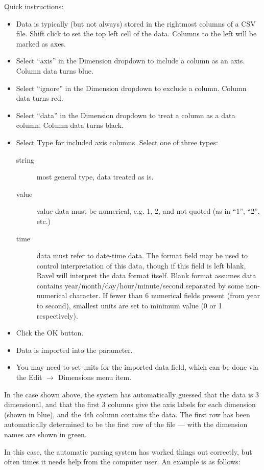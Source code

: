 Quick instructions: 
\begin{itemize}
\item Data is typically (but not always) stored in the rightmost columns
of a CSV file. Shift click to set the top left cell of the data. Columns
to the left will be marked as axes. 
\item Select ``axis'' in the Dimension dropdown to include a column as
an axis. Column data turns blue. 
\item Select ``ignore'' in the Dimension dropdown to exclude a column.
Column data turns red. 
\item Select ``data'' in the Dimension dropdown to treat a column as a
data column. Column data turns black. 
\item Select Type for included axis columns. Select one of three types: 
\begin{description}
\item [{string}] most general type, data treated as is. 
\item [{value}] value data must be numerical, e.g. 1, 2, and not quoted
(as in ``1'', ``2'', etc.)
\item [{time}] data must refer to date-time data. The format field may
be used to control interpretation of this data, though if this field
is left blank, Ravel will interpret the data format itself. Blank
format assumes data contains year/month/day/hour/minute/second separated
by some non-numerical character. If fewer than 6 numerical fields
present (from year to second), smallest units are set to minimum value
(0 or 1 respectively). 
\end{description}
\item Click the OK button. 
\item Data is imported into the parameter. 
\item You may need to set units for the imported data field, which can be
done via the Edit $\rightarrow$ Dimensions menu item.
\end{itemize}
In the case shown above, the system has automatically guessed that
the data is 3 dimensional, and that the first 3 columns give the axis
labels for each dimension (shown in blue), and the 4th column contains
the data. The first row has been automatically determined to be the
first row of the file --- with the dimension names are shown in green.

In this case, the automatic parsing system has worked things out correctly,
but often times it needs help from the computer user. An example is
as follows:
\begin{center}
\par\end{center}

